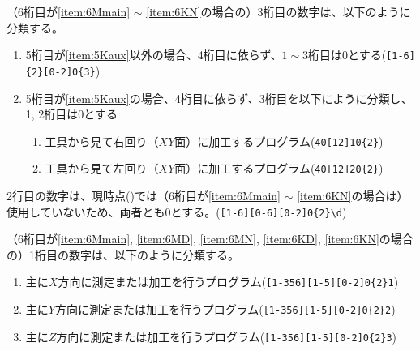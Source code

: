 （6桁目が\ref{item:6Mmain} $\sim$ \ref{item:6KN}\hx の場合の）3桁目の数字は、以下のように分類する。
\begin{enumerate}[label=\alph*), ref=\alph*)]
\item 5桁目が\ref{item:5Kaux}\hx 以外の場合、4桁目に依らず、$1\sim3$桁目は0とする(\verb|[1-6]{2}[0-2]0{3}|)
\item 5桁目が\ref{item:5Kaux}\hx の場合、4桁目に依らず、3桁目を以下にように分類し、1, 2桁目は0とする
  \begin{enumerate}[label=\arabic*.]
  \item 工具から見て右回り（$XY$面）に加工するプログラム(\verb|40[12]10{2}|)
  \item 工具から見て左回り（$XY$面）に加工するプログラム(\verb|40[12]20{2}|)
  \end{enumerate}
\end{enumerate}



2行目の数字は、現時点(\customtodayap)では（6桁目が\ref{item:6Mmain} $\sim$ \ref{item:6KN}\hx の場合は）使用していないため、両者とも0とする。(\verb|[1-6][0-6][0-2]0{2}\d|)



（6桁目が\ref{item:6Mmain}, \ref{item:6MD}, \ref{item:6MN}, \ref{item:6KD}, \ref{item:6KN}\hx の場合の）1桁目の数字は、以下のように分類する。
\begin{enumerate}[label=\arabic*.]
\item 主に$X$方向に測定または加工を行うプログラム(\verb|[1-356][1-5][0-2]0{2}1|)
\item 主に$Y$方向に測定または加工を行うプログラム(\verb|[1-356][1-5][0-2]0{2}2|)
\item 主に$Z$方向に測定または加工を行うプログラム(\verb|[1-356][1-5][0-2]0{2}3|)
\end{enumerate}
